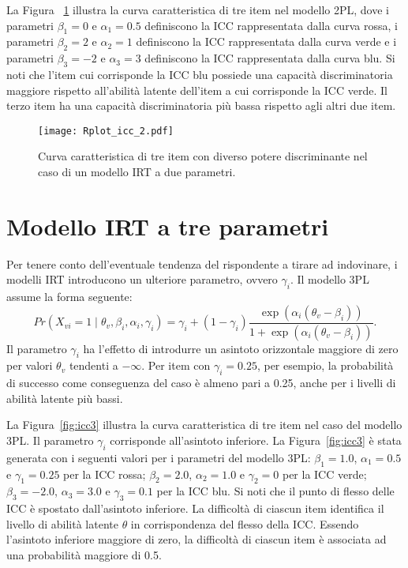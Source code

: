 La Figura ~\ref{fig:icc2} illustra la curva caratteristica di tre item nel modello 2PL, dove i parametri $\beta_1=0$ e $\alpha_1=0.5$ definiscono la ICC rappresentata dalla curva rossa, i
parametri $\beta_2=2$ e $\alpha_2=1$ definiscono la ICC rappresentata dalla curva verde e i parametri $\beta_3=-2$ e $\alpha_3=3$ definiscono la ICC rappresentata dalla curva blu. 
Si noti che l'item cui corrisponde la ICC blu possiede una capacità discriminatoria maggiore rispetto all'abilità latente dell'item a cui corrisponde la ICC verde. 
Il terzo item ha una capacità discriminatoria più bassa rispetto agli altri due item.

\begin{figure}[h!]
\begin{center}
\texttt{[image: Rplot\_icc\_2.pdf]}
\caption{Curva caratteristica di tre item con diverso potere discriminante nel caso di un modello IRT a due parametri.}
\label{fig:icc2}
\end{center}
\end{figure}

\section{Modello IRT a tre parametri}

Per tenere conto dell'eventuale tendenza del rispondente a tirare ad indovinare, i modelli IRT introducono un ulteriore parametro, ovvero $\gamma_i$. 
Il modello 3PL assume la forma seguente:
\begin{equation} 
Pr(X_{vi} = 1 \mid  \theta_v, \beta_i, \alpha_i, \gamma_i) = \gamma_i + (1-\gamma_i) \frac{\exp(\alpha_i(\theta_v-\beta_i))}{1 + \exp(\alpha_i(\theta_v-\beta_i))}.
\end{equation}
Il parametro $\gamma_i$ ha l'effetto di introdurre un asintoto orizzontale maggiore di zero per valori  $\theta_v$ tendenti a $-\infty$. 
Per item con $\gamma_i = 0.25$, per esempio, la probabilità di successo come conseguenza del caso è almeno pari a 0.25, anche per i livelli di abilità latente più bassi. 

La Figura~\ref{fig:icc3} illustra la curva caratteristica di tre item nel caso del modello 3PL. 
Il parametro $\gamma_i$ corrisponde all'asintoto inferiore.  
La Figura~\ref{fig:icc3} è stata generata con i seguenti valori per i parametri del modello 3PL: $\beta_1=1.0$, $\alpha_1=0.5$ e $\gamma_1=0.25$ per la ICC rossa; $\beta_2=2.0$, $\alpha_2=1.0$ e $\gamma_2=0$ per la ICC verde; $\beta_3=-2.0$, $\alpha_3=3.0$ e $\gamma_3=0.1$ per la ICC blu.
Si noti che il punto di flesso delle ICC è spostato dall'asintoto inferiore.  
La difficoltà di ciascun item identifica il livello di abilità latente $\theta$ in corrispondenza del flesso della ICC. 
Essendo l'asintoto inferiore maggiore di zero, la difficoltà di ciascun item è associata ad una probabilità maggiore di 0.5. 

